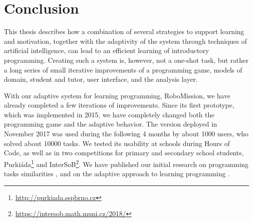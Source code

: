 \chapter{Conclusion}
\label{chap:conclusion}



This thesis describes how a combination of several strategies to support
learning and motivation, together with the adaptivity of the system
through techniques of artificial intelligence,
can lead to an efficient learning of introductory programming. %
Creating such a system is, however, not a one-shot task, but rather a long series
of small iterative improvements of a programming game,
models of domain, student and tutor, user interface, and the analysis layer.

With our adaptive system for learning programming, RoboMission,
we have already completed a few iterations of improvements.
Since its first prototype, which was implemented in 2015,
we have completely changed both the programming game and the adaptive behavior.
The version deployed in November 2017 was used during the following 4 months
by about 1000 users, who solved about 10000 tasks.
We tested its usability at schools during Hours of Code,
as well as in two competitions for primary and secondary school students,
Purkiáda\footnote{\url{http://purkiada.sspbrno.cz}} and
InterSoB\footnote{\url{https://intersob.math.muni.cz/2018/}}.
We have published  our initial research on programming tasks similarities \cite{alg.similarity},
and on the adaptive approach to learning programming \cite{robomission}.




